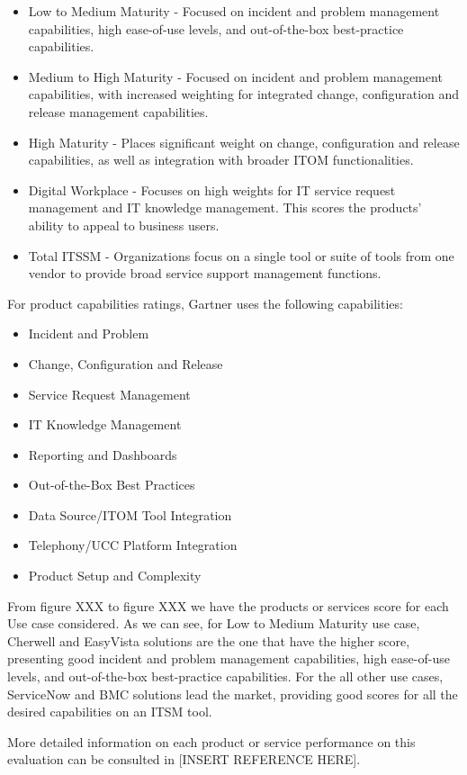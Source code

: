 \begin{itemize}
\item Low to Medium Maturity - Focused on incident and problem management capabilities, high ease-of-use levels, and out-of-the-box best-practice capabilities.
\item Medium to High Maturity - Focused on incident and problem management capabilities, with increased weighting for integrated change, configuration and release management capabilities.
\item High Maturity - Places significant weight on change, configuration and release capabilities, as well as integration with broader ITOM functionalities.
\item Digital Workplace - Focuses on high weights for IT service request management and IT knowledge management. This scores the products' ability to appeal to business users.
\item Total ITSSM - Organizations focus on a single tool or suite of tools from one vendor to provide broad service support management functions.
\end{itemize}

For product capabilities ratings, Gartner uses the following capabilities:

\begin{itemize}
\item Incident and Problem
\item Change, Configuration and Release
\item Service Request Management
\item IT Knowledge Management
\item Reporting and Dashboards
\item Out-of-the-Box Best Practices
\item Data Source/ITOM Tool Integration
\item Telephony/UCC Platform Integration
\item Product Setup and Complexity
\end{itemize}

From figure XXX to figure XXX we have the products or services score for each Use case considered. As we can see, for Low to Medium Maturity use case, Cherwell and EasyVista solutions are the one that have the higher score, presenting good incident and problem management capabilities, high ease-of-use levels, and out-of-the-box best-practice capabilities. For the all other use cases, ServiceNow and BMC solutions lead the market, providing good scores for all the desired capabilities on an ITSM tool.\par
More detailed information on each product or service performance on this evaluation can be consulted in [INSERT REFERENCE HERE].

